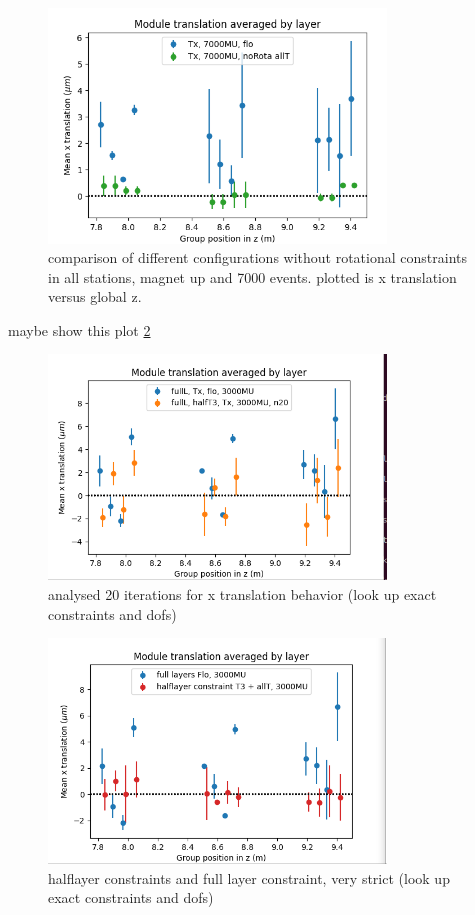 \begin{figure}
  \centering
  \includegraphics[width=0.8\textwidth]{plots/june_21/Tx_noRota_allT_7000MU.png}
  \caption{comparison of different configurations without rotational constraints in all stations, magnet up and 7000 events. plotted is x translation versus global z.}
  \label{fig:june_2}
\end{figure}

maybe show this plot \ref{fig:june_3}
\begin{figure}
  \centering
  \includegraphics[width=0.8\textwidth]{plots/june_21/allT_halfT3_n20_Tx.png}
  \caption{analysed 20 iterations for x translation behavior (look up exact constraints and dofs)}
  \label{fig:june_3}
\end{figure}

\begin{figure}
  \centering
  \includegraphics[width=0.8\textwidth]{plots/june_21/allT_halfT3_Tx_vs_Flo.png}
  \caption{halflayer constraints and full layer constraint, very strict (look up exact constraints and dofs)}
  \label{fig:june_4}
\end{figure}

